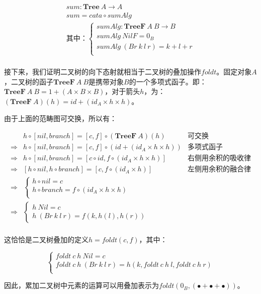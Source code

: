 \documentclass{article}
\begin{document}
\begin{example}
\[
\begin{array}{l}
sum : \mathbf{Tree}\ A \to A \\
sum = cata \circ sumAlg \\
\text{其中：}
      \begin{cases}
        sumAlg : \mathbf{TreeF}\ A\ B \to B \\
        sumAlg\ NilF = 0_{B} \\
        sumAlg\ (Br\ k\ l\ r) = k + l + r \\
      \end{cases} \\
\end{array}
\]

接下来，我们证明二叉树的向下态射就相当于二叉树的叠加操作$foldt$。固定对象$A$，二叉树的函子$\mathbf{TreeF}\ A\ B$是携带对象$B$的一个多项式函子。即：$\mathbf{TreeF}\ A\ B = 1 + (A \times B \times B)$，对于箭头$h$，为：$(\mathbf{TreeF}\ A)(h) = id + (id_A \times h \times h)$。

由于上面的范畴图可交换，所以有：

\[
\begin{array}{rll}
            & h \circ [nil, branch] = [c, f] \circ (\mathbf{TreeF}\ A)(h) & \text{可交换} \\
\Rightarrow & h \circ [nil, branch] = [c, f] \circ (id + (id_A \times h \times h)) & \text{多项式函子} \\
\Rightarrow & h \circ [nil, branch] = [c \circ id, f \circ (id_A \times h \times h)] & \text{右侧用余积的吸收律} \\
\Rightarrow & [h \circ nil, h \circ branch] = [c, f \circ (id_A \times h)] & \text{左侧用余积的融合律} \\
\Rightarrow &
  \begin{cases}
    h \circ nil = c \\
    h \circ branch = f \circ (id_A \times h \times h) \\
  \end{cases} & \\
\Rightarrow &
  \begin{cases}
    h\ Nil = c \\
    h\ (Br\ k\ l\ r) = f(k, h(l), h(r))
  \end{cases} & \\
\end{array}
\]

这恰恰是二叉树叠加的定义$h = foldt(c, f)$，其中：

\[
\begin{cases}
foldt\ c\ h\ Nil = c \\
foldt\ c\ h\ (Br\ k\ l\ r) = h(k, foldt\ c\ h\ l, foldt\ c\ h\ r) \\
\end{cases}
\]

因此，累加二叉树中元素的运算可以用叠加表示为$foldt(0_B, (\bullet + \bullet + \bullet))$。
\end{example}
\end{document}
